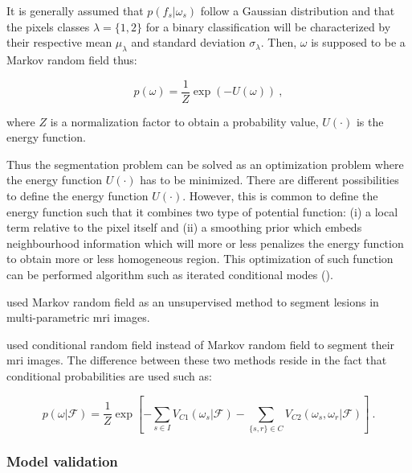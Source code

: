 \begin{enumerate}[leftmargin=*]
It is generally assumed that $p(f_s | \omega_s)$ follow a Gaussian distribution and that the pixels classes $\lambda = \{1,2\}$ for a binary classification will be characterized by their respective mean $\mu_{\lambda}$ and standard deviation $\sigma_{\lambda}$. Then, $\omega$ is supposed to be a Markov random field thus:

\begin{equation}
	p(\omega) =  \frac{1}{Z} \exp\left( -U(\omega) \right)  \ ,
	\label{eq:mrf2}
\end{equation}

\noindent where $Z$ is a normalization factor to obtain a probability value, $U(\cdot)$ is the energy function.

Thus the segmentation problem can be solved as an optimization problem where the energy function $U(\cdot)$ has to be minimized. There are different possibilities to define the energy function $U(\cdot)$. However, this is common to define the energy function such that it combines two type of potential function: (i) a local term relative to the pixel itself and (ii) a smoothing prior which embeds neighbourhood information which will more or less penalizes the energy function to obtain more or less homogeneous region. This optimization of such function can be performed algorithm such as iterated conditional modes (\cite{Kato2001}).

\cite{Liu2009,Ozer2010} used Markov random field as an unsupervised method to segment lesions in multi-parametric \ac{mri} images.

\cite{Artan2009,Artan2010} used conditional random field instead of Markov random field to segment their \ac{mri} images. The difference between these two methods reside in the fact that conditional probabilities are used such as:

\begin{equation}
	p(\omega|\mathcal{F}) =  \frac{1}{Z} \exp \left[ - \sum_{s \in I} V_{C1}(\omega_s|\mathcal{F}) - \sum_{\{s,r\} \in C } V_{C2} (\omega_s,\omega_r|\mathcal{F})  \right] \ .
\label{eq:crf}
\end{equation}

\end{enumerate}

\subsubsection{Model validation}

